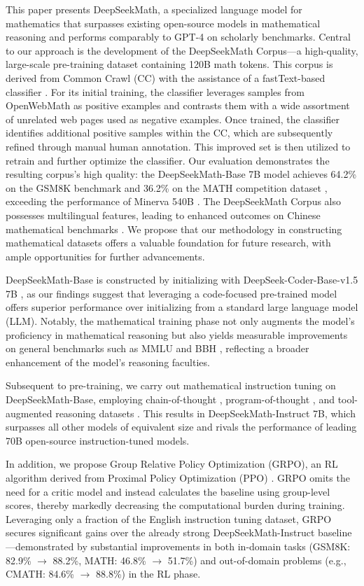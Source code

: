 This paper presents DeepSeekMath, a specialized language model for mathematics that surpasses existing open-source models in mathematical reasoning and performs comparably to GPT-4 on scholarly benchmarks. Central to our approach is the development of the DeepSeekMath Corpus—a high-quality, large-scale pre-training dataset containing 120B math tokens. This corpus is derived from Common Crawl (CC) with the assistance of a fastText-based classifier \citep{joulin2016fasttext}. For its initial training, the classifier leverages samples from OpenWebMath \citep{openwebmath} as positive examples and contrasts them with a wide assortment of unrelated web pages used as negative examples. Once trained, the classifier identifies additional positive samples within the CC, which are subsequently refined through manual human annotation. This improved set is then utilized to retrain and further optimize the classifier. Our evaluation demonstrates the resulting corpus's high quality: the DeepSeekMath-Base 7B model achieves 64.2\% on the GSM8K benchmark \citep{gsm8k} and 36.2\% on the MATH competition dataset \citep{MATH}, exceeding the performance of Minerva 540B \citep{minerva}. The DeepSeekMath Corpus also possesses multilingual features, leading to enhanced outcomes on Chinese mathematical benchmarks \citep{wei2023cmath,agieval}. We propose that our methodology in constructing mathematical datasets offers a valuable foundation for future research, with ample opportunities for further advancements.

DeepSeekMath-Base is constructed by initializing with DeepSeek-Coder-Base-v1.5 7B \citep{deepseek-coder}, as our findings suggest that leveraging a code-focused pre-trained model offers superior performance over initializing from a standard large language model (LLM). Notably, the mathematical training phase not only augments the model’s proficiency in mathematical reasoning but also yields measurable improvements on general benchmarks such as MMLU \citep{mmlu} and BBH \citep{bbh}, reflecting a broader enhancement of the model’s reasoning faculties.

Subsequent to pre-training, we carry out mathematical instruction tuning on DeepSeekMath-Base, employing chain-of-thought \citep{cot}, program-of-thought \citep{pot,pal}, and tool-augmented reasoning datasets \citep{tora}. This results in DeepSeekMath-Instruct 7B, which surpasses all other models of equivalent size and rivals the performance of leading 70B open-source instruction-tuned models.

In addition, we propose Group Relative Policy Optimization (GRPO), an RL algorithm derived from Proximal Policy Optimization (PPO) \citep{schulman2017proximal}. GRPO omits the need for a critic model and instead calculates the baseline using group-level scores, thereby markedly decreasing the computational burden during training. Leveraging only a fraction of the English instruction tuning dataset, GRPO secures significant gains over the already strong DeepSeekMath-Instruct baseline—demonstrated by substantial improvements in both in-domain tasks (GSM8K: 82.9\% $\rightarrow$ 88.2\%, MATH: 46.8\% $\rightarrow$ 51.7\%) and out-of-domain problems (e.g., CMATH: 84.6\% $\rightarrow$ 88.8\%) in the RL phase. 


